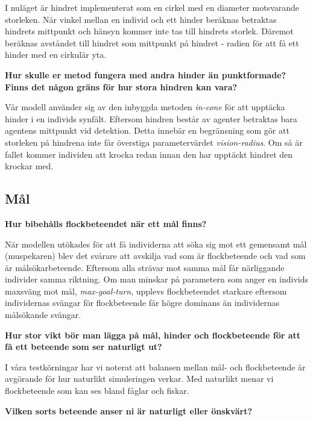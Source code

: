 \documentclass[titlepage, a4paper, 12pt]{article}
\begin{document}
I nuläget är hindret implementerat som en cirkel med en diameter
motsvarande storleken. När vinkel mellan en individ och ett hinder
beräknas betraktas hindrets mittpunkt och hänsyn kommer inte tas till
hindrets storlek. Däremot beräknas avståndet till hindret som
mittpunkt på hindret - radien för att få ett hinder med en
cirkulär yta.

\textbf{Hur skulle er metod fungera med andra hinder än punktformade?
  Finns det någon gräns för hur stora hindren kan vara?}

Vår modell använder sig av den inbyggda metoden \textit{in-cone} för
att upptäcka hinder i en individs synfält. Eftersom hindren består av
agenter betraktas bara agentens mittpunkt vid detektion. Detta innebär
en begränsning som gör att storleken på hindrena inte får överstiga
parametervärdet \textit{vision-radius}. Om så är fallet kommer
individen att krocka redan innan den har upptäckt hindret den krockar
med.

\subsection{Mål}
            
\textbf{Hur bibehålls flockbeteendet när ett mål finns?}


När modellen utökades för att få individerna att söka sig mot ett
gemensamt mål (muspekaren) blev det svårare att avskilja vad som är
flockbeteende och vad som är målsökarbeteende. Eftersom alla strävar
mot samma mål får närliggande individer samma riktning. Om man minskar
på parametern som anger en individs maxsväng mot mål,
\textit{max-goal-turn}, upplevs flockbeteendet starkare eftersom
individernas svängar för flockbeteende får högre dominans än
individernas målsökande svängar.

\textbf{Hur stor vikt bör man lägga på mål, hinder och flockbeteende
  för att få ett beteende som ser naturligt ut?}

I våra testkörningar har vi noterat att balansen mellan mål- och
flockbeteende är avgörande för hur naturlikt simuleringen verkar. Med
naturlikt menar vi flockbeteende som kan ses bland fåglar och
fiskar.

\textbf{Vilken sorts beteende anser ni är naturligt eller önskvärt?}
\end{document}
